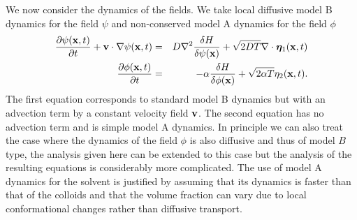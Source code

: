 We now consider the dynamics of the fields. We take local diffusive model B dynamics for the field $\psi$ and non-conserved model A dynamics for the field $\phi$
\begin{eqnarray}
\frac{\partial \psi({\bf x},t)}{\partial t} +{\bf v}\cdot { \nabla}\psi({\bf x},t)&=& D\nabla^2\frac{\delta H}{\delta \psi({\bf x})}+ \sqrt{2D T}\nabla \cdot {\bm \eta}_1({\bf x},t) \\
\frac{\partial \phi({\bf x},t)}{\partial t} &=& -\alpha\frac{\delta H}{\delta \phi({\bf x})}+ \sqrt{2\alpha T}{ \eta}_2({\bf x},t).
\end{eqnarray}
The first equation corresponds to standard model B dynamics but with an advection term by a constant velocity field $\bf v$. The second equation has no advection term and is simple model A dynamics. In principle we can also treat the case where the dynamics of the field $\phi$ is also diffusive and thus of model $B$ type, the analysis given here can be extended to this case but the analysis of the resulting equations is considerably more complicated. The use of model A dynamics for the solvent is justified by assuming that its dynamics is faster than that of the colloids and that the volume fraction can vary due to local conformational changes rather than  diffusive transport.

